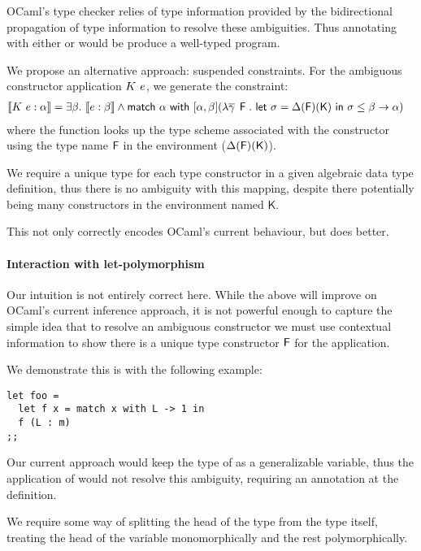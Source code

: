 \documentclass[acmsmall,screen,nonacm]{acmart}
\begin{document}
OCaml's type checker relies of type information provided by the
bidirectional propagation of type information to resolve these
ambiguities. Thus annotating  with either  or  would
be produce a well-typed program.

We propose an alternative approach: suspended constraints. For the ambiguous
constructor application $K ~ e$, we generate the constraint:
\begin{align*}
\llbracket K ~ e : \alpha \rrbracket &= \exists {\beta}. ~ \llbracket e : \beta \rrbracket \wedge \mathsf{match} ~ \alpha ~ \mathsf{with} ~ [ \alpha, \beta ] (\lambda \overline{\gamma} \mathop{}\mathrel{\mathsf{F}}. ~ \mathsf{let} ~ \sigma = \Delta(\mathsf{F})(\mathsf{K}) ~ \mathsf{in} ~ \sigma \leq \beta \to \alpha )
\end{align*}
where the function looks up the type scheme associated with the constructor
using the type name $\mathsf{F}$ in the environment ($\Delta(\mathsf{F})(\mathsf{K})$).

We require a unique type for each type constructor in a given algebraic data
type definition, thus there is no ambiguity with this mapping, despite there
potentially being many constructors in the environment named $\mathsf{K}$.

This not only correctly encodes OCaml's current behaviour, but does better.


\paragraph{Interaction with let-polymorphism}

Our intuition is not entirely correct here. While the above will improve on
OCaml's current inference approach, it is not powerful enough to capture the
simple idea that to resolve an ambiguous constructor we must use contextual
information to show there is a unique type constructor $\mathsf{F}$ for the
application.

We demonstrate this is with the following example:
\begin{lstlisting}
let foo =
  let f x = match x with L -> 1 in 
  f (L : m)
;;
\end{lstlisting}
Our current approach would keep the type of  as a generalizable
variable, thus the application of  would not resolve this ambiguity,
requiring an annotation at the definition.

We require some way of splitting the head of the type from the type itself,
treating the head of the variable monomorphically and the rest
polymorphically.
\end{document}

